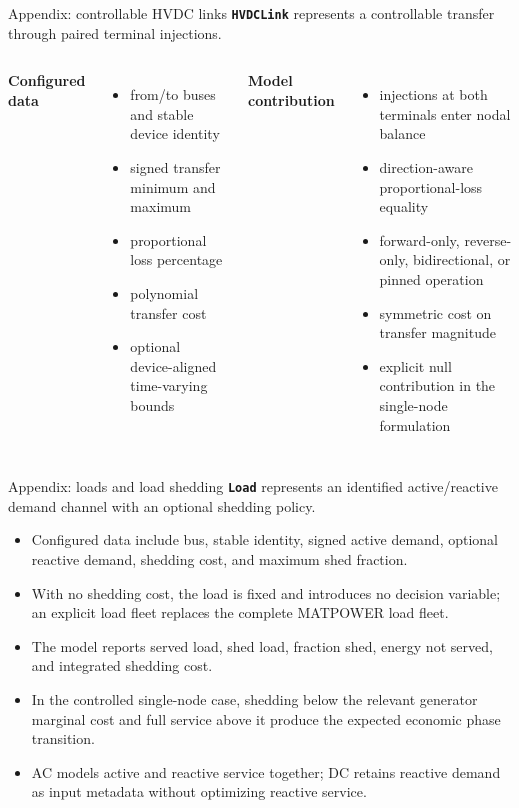 \documentclass[aspectratio=169,11pt]{beamer}
\newcommand{\tightitems}{\setlength{\itemsep}{0.42em}}
\begin{document}
\begin{frame}{Appendix: controllable HVDC links}
  \textbf{\texttt{HVDCLink}} represents a controllable transfer through paired terminal injections.
  \begin{columns}[T,onlytextwidth]
    \textbf{Configured data}
    \begin{itemize}\small\tightitems
      \item from/to buses and stable device identity
      \item signed transfer minimum and maximum
      \item proportional loss percentage
      \item polynomial transfer cost
      \item optional device-aligned time-varying bounds
    \end{itemize}
    \textbf{Model contribution}
    \begin{itemize}\small\tightitems
      \item injections at both terminals enter nodal balance
      \item direction-aware proportional-loss equality
      \item forward-only, reverse-only, bidirectional, or pinned operation
      \item symmetric cost on transfer magnitude
      \item explicit null contribution in the single-node formulation
    \end{itemize}
  \end{columns}
\end{frame}

\begin{frame}{Appendix: loads and load shedding}
  \textbf{\texttt{Load}} represents an identified active/reactive demand channel with an optional shedding policy.
  \begin{itemize}\tightitems
    \item Configured data include bus, stable identity, signed active demand, optional reactive demand, shedding cost, and maximum shed fraction.
    \item With no shedding cost, the load is fixed and introduces no decision variable; an explicit load fleet replaces the complete MATPOWER load fleet.
    \item The model reports served load, shed load, fraction shed, energy not served, and integrated shedding cost.
    \item In the controlled single-node case, shedding below the relevant generator marginal cost and full service above it produce the expected economic phase transition.
    \item AC models active and reactive service together; DC retains reactive demand as input metadata without optimizing reactive service.
  \end{itemize}
\end{frame}
\end{document}
